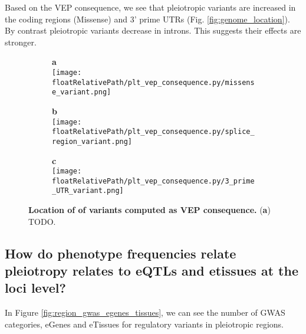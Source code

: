 Based on the VEP consequence, we see that pleiotropic variants are increased in the coding regions (Missense) and 3' prime UTRs (Fig. \ref{fig:genome_location}).
By contrast pleiotropic variants decrease in introns.
This suggests their effects are stronger.

\begin{figure*}[!]
\centering
%
\begin{subfigure}[]{.33\textwidth}
\textbf{a}
\\
\texttt{[image: \\floatRelativePath/plt\_vep\_consequence.py/missense\_variant.png]}
%
\end{subfigure}
%
\begin{subfigure}[]{.33\textwidth}
\textbf{b}
\\
\texttt{[image: \\floatRelativePath/plt\_vep\_consequence.py/splice\_region\_variant.png]}
%
\end{subfigure}
%
\begin{subfigure}[]{.33\textwidth}
\textbf{c}
\\
\texttt{[image: \\floatRelativePath/plt\_vep\_consequence.py/3\_prime\_UTR\_variant.png]}
%
\end{subfigure}
%
\caption{\textbf{Location of of variants computed as VEP consequence.} (\textbf{a}) TODO.} \label{fig:gwas_cat_vs_egene_and_sample}
%
\end{figure*}

\subsection*{How do phenotype frequencies relate pleiotropy relates to eQTLs and etissues at the loci level?}

In Figure \ref{fig:region_gwas_egenes_tissues}, we can see the number of GWAS categories, eGenes and eTissues for regulatory variants in pleiotropic regions.

